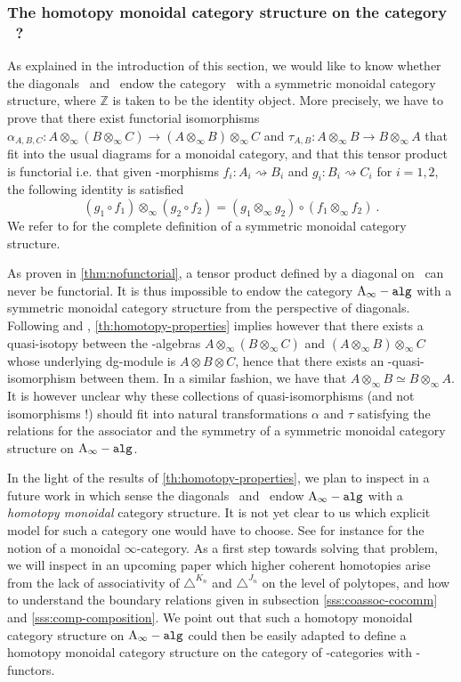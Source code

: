 \documentclass[twoside, 12pt]{amsart}
\theoremstyle{remark}
\begin{document}
\subsubsection{The homotopy monoidal category structure on the category \Aalg\ ?} 

As explained in the introduction of this section, we would like to know whether the diagonals \diagainf\ and \diagminf\ endow the category \Aalg\ with a symmetric monoidal category structure, where $\mathbb{Z}$ is taken to be the identity object. More precisely, we have to prove that there exist functorial isomorphisms $\alpha_{A,B,C} : A \otimes_\infty ( B \otimes_\infty C) \rightarrow (A \otimes_\infty B) \otimes_\infty C$ and $\tau_{A,B} : A \otimes_\infty B \rightarrow B \otimes_\infty A$ that fit into the usual diagrams for a monoidal category, and that this tensor product is functorial i.e. that given \Ainf -morphisms $f_i : A_i \rightsquigarrow B_i$ and $g_i : B_i \rightsquigarrow C_i$ for $i=1,2$, the following identity is satisfied 
\[ (g_1 \circ f_1) \otimes_\infty (g_2 \circ f_2) = (g_1 \otimes_\infty g_2) \circ (f_1 \otimes_\infty f_2) \ . \]
We refer to \cite{MacLane98} for the complete definition of a symmetric monoidal category structure.

As proven in \cref{thm:nofunctorial}, a tensor product defined by a diagonal on \Minf\ can never be functorial. It is thus impossible to endow the category $\mathtt{\mathrm{A}_\infty -alg}$ with a symmetric monoidal category structure from the perspective of diagonals.
Following \cite{fukaya-cyclic-symmetry} and \cite{MarklShnider06}, \cref{th:homotopy-properties} implies however that there exists a quasi-isotopy between the \Ainf -algebras $A \otimes_\infty ( B \otimes_\infty C)$ and $(A \otimes_\infty B) \otimes_\infty C$ whose underlying dg-module is $A \otimes B \otimes C$, hence that there exists an \Ainf -quasi-isomorphism between them.  In a similar fashion, we have that $A \otimes_\infty B \simeq B \otimes_\infty A$.
It is however unclear why these collections of quasi-isomorphisms (and not isomorphisms !) should fit into natural transformations $\alpha$ and $\tau$ satisfying the relations for the associator and the symmetry of a symmetric monoidal category structure on $\mathtt{\mathrm{A}_\infty -alg}$. 

In the light of the results of \cref{th:homotopy-properties}, we plan to inspect in a future work in which sense the diagonals \diagainf\ and \diagminf\ endow $\mathtt{\mathrm{A}_\infty -alg}$ with a \textit{homotopy monoidal} category structure. It is not yet clear to us which explicit model for such a category one would have to choose. See for instance \cite[Definition A.5.2]{Pascaleff18} for the notion of a monoidal $\infty$-category. As a first step towards solving that problem, we will inspect in an upcoming paper which higher coherent homotopies arise from the lack of associativity of $\triangle^{K_n}$ and $\triangle^{J_n}$ on the level of polytopes, and how to understand the boundary relations given in subsection \ref{sss:coassoc-cocomm} and \ref{sss:comp-composition}.
We point out that such a homotopy monoidal category structure on $\mathtt{\mathrm{A}_\infty -alg}$ could then be easily adapted to define a homotopy monoidal category structure on the category of \Ainf -categories with \Ainf -functors.
\end{document}
